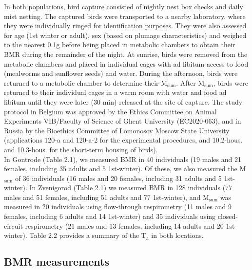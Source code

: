 \documentclass[10pt, twoside]{book} %
\begin{document}
In both populations, bird capture consisted of nightly nest box checks and daily mist netting. The captured birds were transported to a nearby laboratory, where they were individually ringed for identification purposes. They were also assessed for age (1st winter or adult), sex (based on plumage characteristics) and weighed to the nearest 0.1g before being placed in metabolic chambers to obtain their BMR during the remainder of the night. At sunrise, birds were removed from the metabolic chambers and placed in individual cages with ad libitum access to food (mealworms and sunflower seeds) and water. During the afternoon, birds were returned to a metabolic chamber to determine their M$_{\text{sum}}$. After M$_{\text{sum}}$, birds were returned to their individual cages in a warm room with water and food ad libitum until they were later (30 min) released at the site of capture. The study protocol in Belgium was approved by the Ethics Committee on Animal Experiments VIB/Faculty of Science of Ghent University (EC2020-063), and in Russia by the Bioethics Committee of Lomonosov Moscow State University (applications 120-a and 120-a-2 for the experimental procedures, and 10.2-hous. and 10.3-hous. for the short-term housing of birds).\\

In Gontrode (Table 2.1), we measured BMR in 40 individuals (19 males and 21 females, including 35 adults and 5 1st-winter). Of these, we also measured the M$_{\text{sum}}$ of 36 individuals (16 males and 20 females, including 31 adults and 5 1st-winter). In Zvenigorod (Table 2.1) we measured BMR in 128 individuals (77 males and 51 females, including 51 adults and 77 1st-winter), and M$_{\text{sum}}$ was measured in 20 individuals using flow-through respirometry (11 males and 9 females, including 6 adults and 14 1st-winter) and 35 individuals using closed-circuit respirometry (21 males and 13 females, including 14 adults and 20 1st-winter). Table 2.2 provides a summary of the T$_{\text{a}}$ in both locations.\\

\subsection{BMR measurements}
\end{document}
